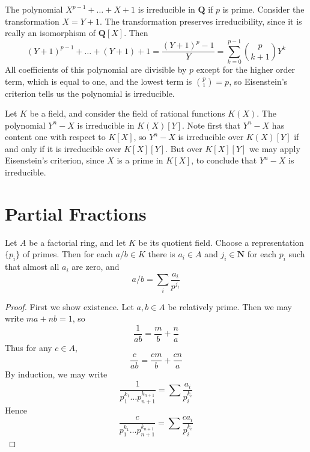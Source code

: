 \begin{example}
    The polynomial $X^{p-1} + \dots + X + 1$ is irreducible in $\mathbf{Q}$ if $p$ is prime. Consider the transformation $X = Y + 1$. The transformation preserves irreducibility, since it is really an isomorphism of $\mathbf{Q}[X]$. Then
    \[ (Y + 1)^{p-1} + \dots + (Y + 1) + 1 = \frac{(Y + 1)^p - 1}{Y} = \sum_{k = 0}^{p-1} \binom{p}{k+1} Y^k \]
    All coefficients of this polynomial are divisible by $p$ except for the higher order term, which is equal to one, and the lowest term is $\binom{p}{1} = p$, so Eisenstein's criterion tells us the polynomial is irreducible.
\end{example}

\begin{example}
    Let $K$ be a field, and consider the field of rational functions $K(X)$. The polynomial $Y^n - X$ is irreducible in $K(X)[Y]$. Note first that $Y^n - X$ has content one with respect to $K[X]$, so $Y^n - X$ is irreducible over $K(X)[Y]$ if and only if it is irreducible over $K[X][Y]$. But over $K[X][Y]$ we may apply Eisenstein's criterion, since $X$ is a prime in $K[X]$, to conclude that $Y^n - X$ is irreducible.
\end{example}


\section{Partial Fractions}

\begin{theorem}
    Let $A$ be a factorial ring, and let $K$ be its quotient field. Choose a representation $\{ p_i \}$ of primes. Then for each $a/b \in K$ there is $a_i \in A$ and $j_i \in \mathbf{N}$ for each $p_i$ such that almost all $a_i$ are zero, and
    \[ a/b = \sum_i \frac{a_i}{p^{j_i}} \]
\end{theorem}
\begin{proof}
    First we show existence. Let $a,b \in A$ be relatively prime. Then we may write $ma + nb = 1$, so
    \[ \frac{1}{ab} = \frac{m}{b} + \frac{n}{a} \]
    Thus for any $c \in A$,
    \[ \frac{c}{ab} = \frac{cm}{b} + \frac{cn}{a} \]
    By induction, we may write
    \[  \frac{1}{p_1^{k_1} \dots p_{n+1}^{k_{n+1}}} = \sum \frac{a_i}{p_i^{k_i}} \]
    Hence
    \[ \frac{c}{p_1^{k_1} \dots p_{n+1}^{k_{n+1}}} = \sum \frac{c a_i}{p_i^{k_i}} \]
\end{proof}













